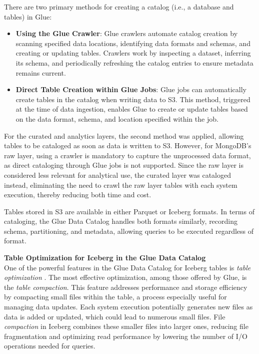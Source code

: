 There are two primary methods for creating a catalog (i.e., a database and tables) in Glue:
\begin{itemize}
    \item \textbf{Using the Glue Crawler}: Glue crawlers automate catalog creation by scanning specified data locations, identifying data formats and schemas, and creating or updating tables. Crawlers work by inspecting a dataset, inferring its schema, and periodically refreshing the catalog entries to ensure metadata remains current.
    
    \item \textbf{Direct Table Creation within Glue Jobs}: Glue jobs can automatically create tables in the catalog when writing data to \ac{S3}. This method, triggered at the time of data ingestion, enables Glue to create or update tables based on the data format, schema, and location specified within the job.
\end{itemize}

For the curated and analytics layers, the second method was applied, allowing tables to be cataloged as soon as data is written to \ac{S3}. However, for MongoDB's raw layer, using a crawler is mandatory to capture the unprocessed data format, as direct cataloging through Glue jobs is not supported. Since the raw layer is considered less relevant for analytical use, the curated layer was cataloged instead, eliminating the need to crawl the raw layer tables with each system execution, thereby reducing both time and cost.

Tables stored in \ac{S3} are available in either Parquet or Iceberg formats. In terms of cataloging, the Glue Data Catalog handles both formats similarly, recording schema, partitioning, and metadata, allowing queries to be executed regardless of format.

\textbf{Table Optimization for Iceberg in the Glue Data Catalog} \\
\label{sec:optimizations}
One of the powerful features in the Glue Data Catalog for Iceberg tables is \textit{table optimization} \cite{optimizations}. The most effective optimization, among those offered by Glue, is the \textit{table compaction}. This feature addresses performance and storage efficiency by compacting small files within the table, a process especially useful for managing data updates. Each system execution potentially generates new files as data is added or updated, which could lead to numerous small files. File \textit{compaction} in Iceberg combines these smaller files into larger ones, reducing file fragmentation and optimizing read performance by lowering the number of \ac{I/O} operations needed for queries.

